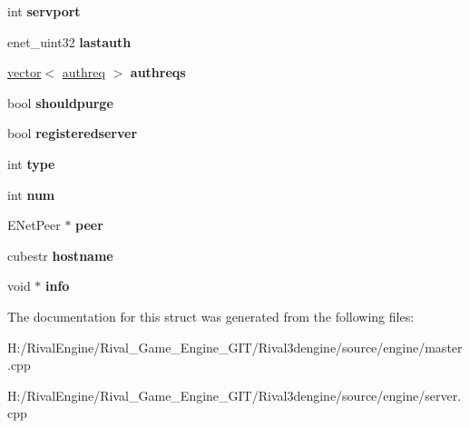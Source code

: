 \begin{DoxyCompactItemize}
int {\bfseries servport}
\item 
\mbox{\label{structclient_a96ab158e5da6a1c4b4d91bd2156d69a6}} 
enet\+\_\+uint32 {\bfseries lastauth}
\item 
\mbox{\label{structclient_ac5cce599724c2ae9afece3647cc61c77}} 
\hyperlink{structvector}{vector}$<$ \hyperlink{structauthreq}{authreq} $>$ {\bfseries authreqs}
\item 
\mbox{\label{structclient_a82b12351d4d3f132dc6ddb9f3c460014}} 
bool {\bfseries shouldpurge}
\item 
\mbox{\label{structclient_a87b66536569f8a87a3ecb798f89fd01d}} 
bool {\bfseries registeredserver}
\item 
\mbox{\label{structclient_a52bb4f1e5551cc4e6a5bac9b6b10a421}} 
int {\bfseries type}
\item 
\mbox{\label{structclient_ad5bc3dbea459c9c274cf33e92411bd63}} 
int {\bfseries num}
\item 
\mbox{\label{structclient_a909db3ee6d690070a7b3bb84f85ca55d}} 
E\+Net\+Peer $\ast$ {\bfseries peer}
\item 
\mbox{\label{structclient_abc6088526d5f9b920c5445f005244175}} 
cubestr {\bfseries hostname}
\item 
\mbox{\label{structclient_a565e30169a6d838e27ae4ced2490e755}} 
void $\ast$ {\bfseries info}
\end{DoxyCompactItemize}


The documentation for this struct was generated from the following files\+:\begin{DoxyCompactItemize}
\item 
H\+:/\+Rival\+Engine/\+Rival\+\_\+\+Game\+\_\+\+Engine\+\_\+\+G\+I\+T/\+Rival3dengine/source/engine/master.\+cpp\item 
H\+:/\+Rival\+Engine/\+Rival\+\_\+\+Game\+\_\+\+Engine\+\_\+\+G\+I\+T/\+Rival3dengine/source/engine/server.\+cpp\end{DoxyCompactItemize}
